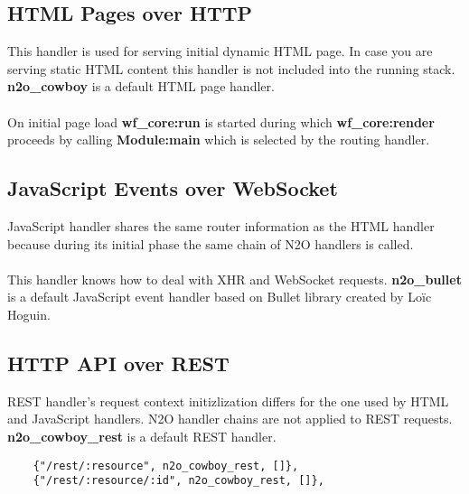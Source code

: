 \subsection{HTML Pages over HTTP}
This handler is used for serving initial dynamic HTML page.
In case you are serving static HTML content this handler is
not included into the running stack. {\bf {n2o}\_{cowboy}} is
a default HTML page handler.

\paragraph{}
On initial page load {\bf {wf}\_{core}:run} is started during
which {\bf {wf}\_{core}:render} proceeds by calling {\bf Module:main} which
is selected by the routing handler.

\subsection{JavaScript Events over WebSocket}
JavaScript handler shares the same router information as the
HTML handler because during its initial phase the same chain
of N2O handlers is called.

\paragraph{}
This handler knows how to deal with XHR and WebSocket requests.
{\bf {n2o}\_{bullet}} is a default JavaScript event handler
based on Bullet library created by Loïc Hoguin.

\newpage
\subsection{HTTP API over REST}
REST handler's request context initizlization differs for the one
used by HTML and JavaScript handlers. N2O handler chains are not
applied to REST requests. {\bf n2o\_cowboy\_rest} is a default REST
handler.

\vspace{1\baselineskip}
\begin{lstlisting}
    {"/rest/:resource", n2o_cowboy_rest, []},
    {"/rest/:resource/:id", n2o_cowboy_rest, []},
\end{lstlisting}

